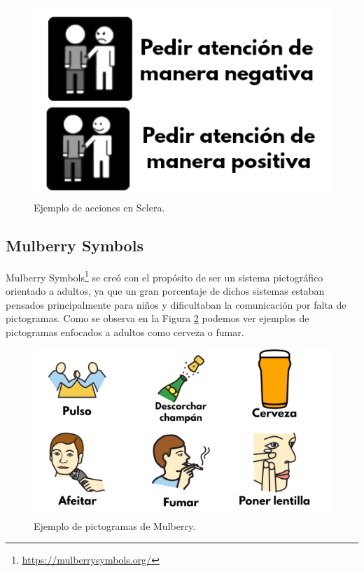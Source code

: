\begin{figure}[h!]
	\centering
	\includegraphics[scale=0.4]{Imagenes/Bitmap/Sclera}
	\caption{Ejemplo de acciones en Sclera.}
	\label{fig:sclera}
\end{figure}


\subsection{Mulberry Symbols}
Mulberry Symbols\footnote{\url{https://mulberrysymbols.org/}} se creó con el propósito de ser un sistema pictográfico orientado a adultos, ya que un gran porcentaje de dichos sistemas estaban pensados principalmente para niños y dificultaban la comunicación por falta de pictogramas. Como se observa en la Figura \ref{fig:mulberry} podemos ver ejemplos de pictogramas enfocados a adultos como cerveza o fumar.

\begin{figure}[h!]
	\centering
	\includegraphics[scale=0.2]{Imagenes/Bitmap/Mulberry}
	\caption{Ejemplo de pictogramas de Mulberry.}
	\label{fig:mulberry}
\end{figure}

